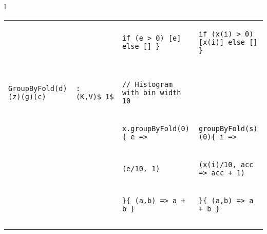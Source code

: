 \begin{figure*}
\begin{tabular}{l}
{\begin{tabular}{ll|l|l}
{} & {} & {\begin{lstlisting}[numbers=none,mathescape=true]
  if (e > 0) [e] else [] }
\end{lstlisting}} &
{\begin{lstlisting}[numbers=none,mathescape=true]
  if (x(i) > 0) [x(i)] else [] }
\end{lstlisting}} \\
\vspace{-0.25cm}

{} & {} & {} & {} \\ \arrayrulecolor[gray]{0.8}\hline
\vspace{-0.25cm}
{} & {} & {} & {} \\
\vspace{-0.075cm}

{\begin{lstlisting}[numbers=none,mathescape=true]
GroupByFold(d)(z)(g)(c)
\end{lstlisting}} &
{\begin{lstlisting}[numbers=none,mathescape=true]
: (K,V)$_1$
\end{lstlisting}} &
{\begin{lstlisting}[numbers=none,mathescape=true]
// Histogram with bin width 10
\end{lstlisting}} & {} \\
\vspace{-0.075cm}

{} & {} & {\begin{lstlisting}[numbers=none,mathescape=true]
x.groupByFold(0){ e =>
\end{lstlisting}} &
{\begin{lstlisting}[numbers=none,mathescape=true]
groupByFold(s)(0){ i =>
\end{lstlisting}} \\
\vspace{-0.075cm}

{} & {} & {\begin{lstlisting}[numbers=none,mathescape=true]
  (e/10, 1)
\end{lstlisting}} &
{\begin{lstlisting}[numbers=none,mathescape=true]
  (x(i)/10, acc => acc + 1)
\end{lstlisting}} \\
\vspace{-0.075cm}

{} & {} & {\begin{lstlisting}[numbers=none,mathescape=true]
}{ (a,b) => a + b }
\end{lstlisting}} &
{\begin{lstlisting}[numbers=none,mathescape=true]
}{ (a,b) => a + b }
\end{lstlisting}} \\
\vspace{-0.3cm}
\\ \arrayrulecolor{black}\hline


\end{tabular}}
\end{tabular}
\end{figure*}
